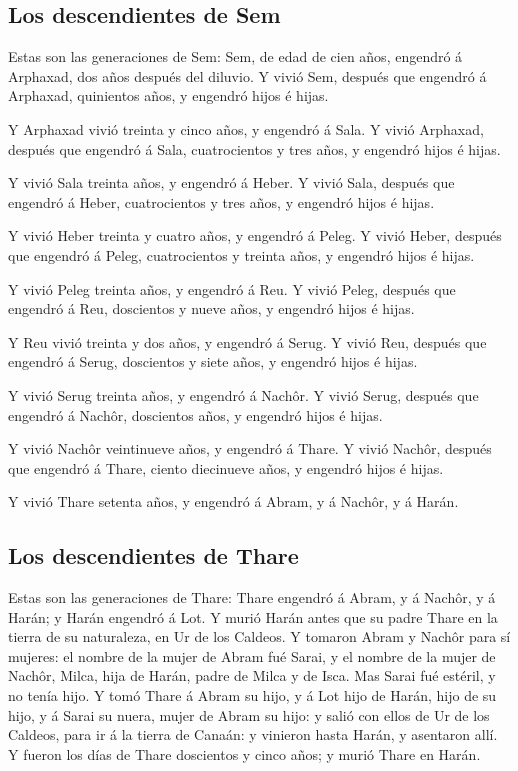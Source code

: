 \hypertarget{los-descendientes-de-sem}{%
\subsection{Los descendientes de Sem}\label{los-descendientes-de-sem}}

 Estas son las generaciones de Sem: Sem, de edad de cien
años, engendró á Arphaxad, dos años después del diluvio.  Y
vivió Sem, después que engendró á Arphaxad, quinientos años, y engendró
hijos é hijas.

 Y Arphaxad vivió treinta y cinco años, y engendró á Sala.
 Y vivió Arphaxad, después que engendró á Sala,
cuatrocientos y tres años, y engendró hijos é hijas.

 Y vivió Sala treinta años, y engendró á Heber.
 Y vivió Sala, después que engendró á Heber, cuatrocientos
y tres años, y engendró hijos é hijas.

 Y vivió Heber treinta y cuatro años, y engendró á Peleg.
 Y vivió Heber, después que engendró á Peleg, cuatrocientos
y treinta años, y engendró hijos é hijas.

 Y vivió Peleg treinta años, y engendró á Reu.
 Y vivió Peleg, después que engendró á Reu, doscientos y
nueve años, y engendró hijos é hijas.

 Y Reu vivió treinta y dos años, y engendró á Serug.
 Y vivió Reu, después que engendró á Serug, doscientos y
siete años, y engendró hijos é hijas.

 Y vivió Serug treinta años, y engendró á Nachôr.
 Y vivió Serug, después que engendró á Nachôr, doscientos
años, y engendró hijos é hijas.

 Y vivió Nachôr veintinueve años, y engendró á Thare.
 Y vivió Nachôr, después que engendró á Thare, ciento
diecinueve años, y engendró hijos é hijas.

 Y vivió Thare setenta años, y engendró á Abram, y á
Nachôr, y á Harán.

\hypertarget{los-descendientes-de-thare}{%
\subsection{Los descendientes de
Thare}\label{los-descendientes-de-thare}}

 Estas son las generaciones de Thare: Thare engendró á
Abram, y á Nachôr, y á Harán; y Harán engendró á Lot.  Y
murió Harán antes que su padre Thare en la tierra de su naturaleza, en
Ur de los Caldeos.  Y tomaron Abram y Nachôr para sí
mujeres: el nombre de la mujer de Abram fué Sarai, y el nombre de la
mujer de Nachôr, Milca, hija de Harán, padre de Milca y de Isca.
 Mas Sarai fué estéril, y no tenía hijo.  Y
tomó Thare á Abram su hijo, y á Lot hijo de Harán, hijo de su hijo, y á
Sarai su nuera, mujer de Abram su hijo: y salió con ellos de Ur de los
Caldeos, para ir á la tierra de Canaán: y vinieron hasta Harán, y
asentaron allí.  Y fueron los días de Thare doscientos y
cinco años; y murió Thare en Harán.

